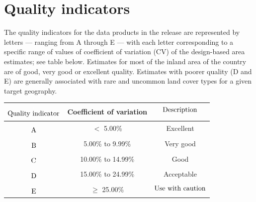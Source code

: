 

\section{Quality indicators}


The quality indicators for the data products in the release \cite{StatCanCoELandCoverArea2025}
are represented by letters --- ranging from A through E ---
with each letter corresponding to a specific range of values
of coefficient of variation (CV) of the design-based area estimates; see table below.
Estimates for most of the inland area of the country
are of good, very good or excellent quality.
Estimates with poorer quality (D and E) are generally associated
with rare and uncommon land cover types for a given target geography.

\begin{center}
\begin{tabular}{|c|c|c|}
\hline
$\overset{{\color{white}1}}{\textnormal{Quality indicator}}$
&
Coefficient of variation
&
$\underset{{\color{white}.}}{\textnormal{Description}}$
\\
\hline
$\overset{{\color{white}1}}{\textnormal{A}}$ & $<$ 5.00\% & Excellent 
\\
$\overset{{\color{white}1}}{\textnormal{B}}$ & 5.00\% to 9.99\% & Very good 
\\
$\overset{{\color{white}1}}{\textnormal{C}}$ & 10.00\% to 14.99\% & Good 
\\
$\overset{{\color{white}1}}{\textnormal{D}}$ & 15.00\% to 24.99\% & Acceptable 
\\
$\overset{{\color{white}1}}{\textnormal{E}}$ & $\geq$ 25.00\% & $\underset{{\color{white}.}}{\textnormal{Use with caution}}$
\\
\hline
\end{tabular}
\end{center}


